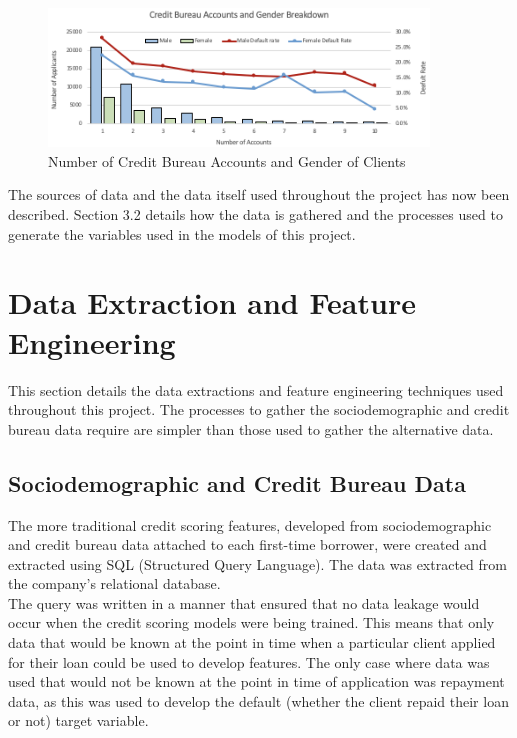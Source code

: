 \vspace{10 pt}

\begin{figure}[!htb]
\centering
\includegraphics[width=0.9\textwidth]{images/credit_bur.png}
\caption{Number of Credit Bureau Accounts and Gender of Clients}
\label{fig:cred}
\end{figure}

\vspace{10 pt}

The sources of data and the data itself used throughout the project has now been described. Section 3.2 details how the data is gathered and the processes used to generate the variables used in the models of this project.   


\section{Data Extraction and Feature Engineering}

This section details the data extractions and feature engineering techniques used throughout this project. The processes to gather the sociodemographic and credit bureau data require are simpler than those used to gather the alternative data.

\subsection{Sociodemographic and Credit Bureau Data}

The more traditional credit scoring features, developed from sociodemographic and credit bureau data attached to each first-time borrower, were created and extracted using SQL (Structured Query Language). The data was extracted from the company's relational database. \\

The query was written in a manner that ensured that no data leakage would occur when the credit scoring models were being trained. This means that only data that would be known at the point in time when a particular client applied for their loan could be used to develop features. The only case where data was used that would not be known at the point in time of application was repayment data, as this was used to develop the default (whether the client repaid their loan or not) target variable. \\

